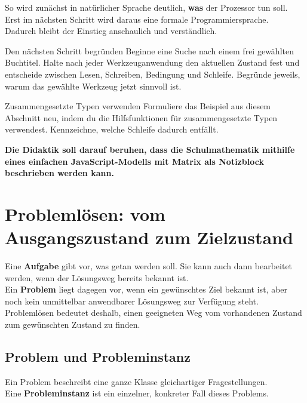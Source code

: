 \documentclass{article}
\begin{document}
        
So wird zunächst in natürlicher Sprache deutlich, \textbf{was} der Prozessor tun soll.\\
          Erst im nächsten Schritt wird daraus eine formale Programmiersprache.\\
          Dadurch bleibt der Einstieg anschaulich und verständlich.

\begin{uebung}{Den nächsten Schritt begründen}
Beginne eine Suche nach einem frei gewählten Buchtitel. Halte nach jeder Werkzeuganwendung den aktuellen Zustand fest und entscheide zwischen Lesen, Schreiben, Bedingung und Schleife. Begründe jeweils, warum das gewählte Werkzeug jetzt sinnvoll ist.
\end{uebung}

\begin{uebung}{Zusammengesetzte Typen verwenden}
Formuliere das Beispiel aus diesem Abschnitt neu, indem du die Hilfsfunktionen für zusammengesetzte Typen verwendest. Kennzeichne, welche Schleife dadurch entfällt.
\end{uebung}


          
\textbf{Die Didaktik soll darauf beruhen, dass die Schulmathematik mithilfe eines einfachen JavaScript-Modells mit Matrix als Notizblock beschrieben werden kann.}


\section{Problemlösen: vom Ausgangszustand zum Zielzustand}

Eine \textbf{Aufgabe} gibt vor, was getan werden soll. Sie kann auch dann bearbeitet werden, wenn der Lösungsweg bereits bekannt ist.\\
Ein \textbf{Problem} liegt dagegen vor, wenn ein gewünschtes Ziel bekannt ist, aber noch kein unmittelbar anwendbarer Lösungsweg zur Verfügung steht.\\
Problemlösen bedeutet deshalb, einen geeigneten Weg vom vorhandenen Zustand zum gewünschten Zustand zu finden.

\subsection{Problem und Probleminstanz}

Ein Problem beschreibt eine ganze Klasse gleichartiger Fragestellungen.\\
Eine \textbf{Probleminstanz} ist ein einzelner, konkreter Fall dieses Problems.
\end{document}
